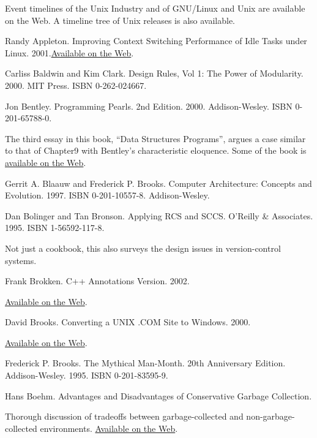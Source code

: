 \documentclass[12pt,oneside]{ctexbook}
\begin{document}
\begin{common-format}
\backmatter
{}

Event timelines of the Unix Industry and of GNU/Linux and Unix are available on the Web. A timeline tree of Unix releases is also available.

\begin{thebibliography}{9}
 Randy Appleton. Improving Context Switching Performance of Idle Tasks under Linux. 2001.\href{http://euclid.nmu.edu/~randy/Research/Papers/Scheduler/}{Available on the Web}.

 Carliss Baldwin and Kim Clark. Design Rules, Vol 1: The Power of Modularity. 2000. MIT Press. ISBN 0-262-024667.

 Jon Bentley. Programming Pearls. 2nd Edition. 2000. Addison-Wesley. ISBN 0-201-65788-0.

The third essay in this book, “Data Structures Programs”, argues a case similar to that of Chapter9 with Bentley's characteristic eloquence. Some of the book is \href{http://www.cs.bell-labs.com/cm/cs/pearls/}{available on the Web}.

 Gerrit A. Blaauw and Frederick P. Brooks. Computer Architecture: Concepts and Evolution. 1997. ISBN 0-201-10557-8. Addison-Wesley.

 Dan Bolinger and Tan Bronson. Applying RCS and SCCS. O'Reilly \&{} Associates. 1995. ISBN 1-56592-117-8.

Not just a cookbook, this also surveys the design issues in version-control systems.

 Frank Brokken. C++ Annotations Version. 2002.

\href{http://www.icce.rug.nl/documents/cplusplus/cplusplus.html}{Available on the Web}.

 David Brooks. Converting a UNIX .COM Site to Windows. 2000.

\href{http://www.securityoffice.net/mssecrets/hotmail.html#_Toc491601819}{Available on the Web}.

 Frederick P. Brooks. The Mythical Man-Month. 20th Anniversary Edition. Addison-Wesley. 1995. ISBN 0-201-83595-9.

 Hans Boehm. Advantages and Disadvantages of Conservative Garbage Collection.

Thorough discussion of tradeoffs between garbage-collected and non-garbage-collected environments. \href{http://www.hpl.hp.com/personal/Hans_Boehm/gc/issues.html}{Available on the Web}.


\end{thebibliography}
\end{common-format}
\end{document}
